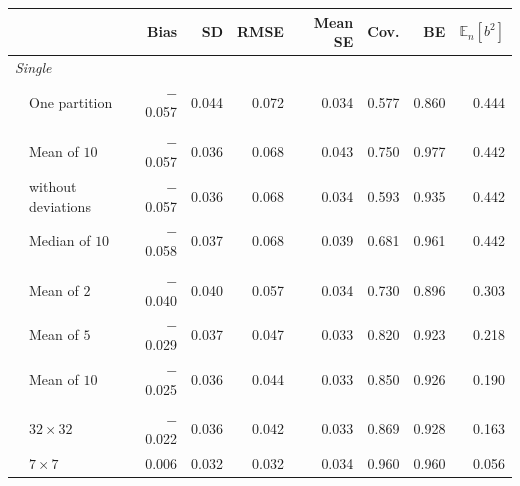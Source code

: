 \begin{tabular}{llrrrrrrr}
\toprule
 &  & Bias & SD & RMSE & Mean SE & Cov. & BE & $\mathbb{E}_n[b^2]$ \\
\midrule
\multicolumn{9}{l}{\emph{Single}} \\
 & One partition & $-$0.057 & 0.044 & 0.072 & 0.034 & 0.577 & 0.860 & 0.444 \\
\addlinespace
\multicolumn{9}{l}{\emph{Estimates}} \\
 & Mean of $10$ & $-$0.057 & 0.036 & 0.068 & 0.043 & 0.750 & 0.977 & 0.442 \\
 & \quad without deviations & $-$0.057 & 0.036 & 0.068 & 0.034 & 0.593 & 0.935 & 0.442 \\
 & Median of $10$ & $-$0.058 & 0.037 & 0.068 & 0.039 & 0.681 & 0.961 & 0.442 \\
\addlinespace
\multicolumn{9}{l}{\emph{Predictions}} \\
 & Mean of $2$ & $-$0.040 & 0.040 & 0.057 & 0.034 & 0.730 & 0.896 & 0.303 \\
 & Mean of $5$ & $-$0.029 & 0.037 & 0.047 & 0.033 & 0.820 & 0.923 & 0.218 \\
 & Mean of $10$ & $-$0.025 & 0.036 & 0.044 & 0.033 & 0.850 & 0.926 & 0.190 \\
\addlinespace
\multicolumn{9}{l}{\emph{Bagging}} \\
 & $32\times32$ & $-$0.022 & 0.036 & 0.042 & 0.033 & 0.869 & 0.928 & 0.163 \\
 & $7\times7$ & 0.006 & 0.032 & 0.032 & 0.034 & 0.960 & 0.960 & 0.056 \\
\bottomrule
\end{tabular}
